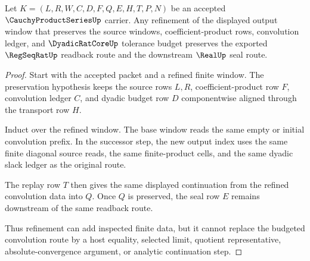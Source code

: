 \begin{theorem}
\label{thm:cauchy-product-series-dyadic-budget-stability}
Let $K=(L,R,W,C,D,F,Q,E,H,T,P,N)$ be an accepted $\CauchyProductSeriesUp$ carrier. Any refinement of the displayed output window that preserves the source windows, coefficient-product rows, convolution ledger, and $\DyadicRatCoreUp$ tolerance budget preserves the exported $\RegSeqRatUp$ readback route and the downstream $\RealUp$ seal route.
\end{theorem}
\begin{proof}
Start with the accepted packet and a refined finite window. The preservation hypothesis keeps the source rows $L,R$, coefficient-product row $F$, convolution ledger $C$, and dyadic budget row $D$ componentwise aligned through the transport row $H$.

Induct over the refined window. The base window reads the same empty or initial convolution prefix. In the successor step, the new output index uses the same finite diagonal source reads, the same finite-product cells, and the same dyadic slack ledger as the original route.

The replay row $T$ then gives the same displayed continuation from the refined convolution data into $Q$. Once $Q$ is preserved, the seal row $E$ remains downstream of the same readback route.

Thus refinement can add inspected finite data, but it cannot replace the budgeted convolution route by a host equality, selected limit, quotient representative, absolute-convergence argument, or analytic continuation step.
\end{proof}



